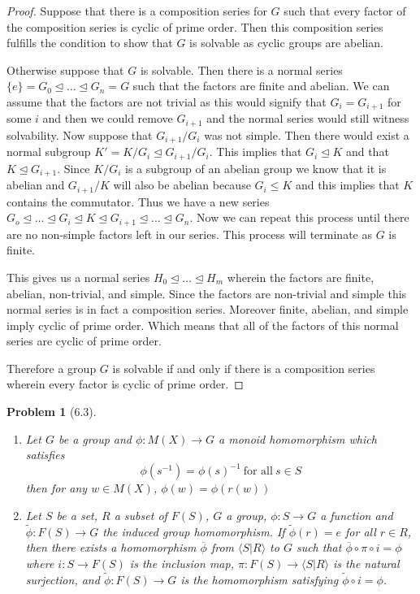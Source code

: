 \documentclass[10pt]{article}
\newcommand{\sk}{\vskip 10mm}
\theoremstyle{plain}
\newtheorem{problem}{Problem}
\theoremstyle{remark}
\begin{document}
\begin{proof}
  Suppose that there is a composition series for $G$ such that
  every factor of the composition series is cyclic of prime order. Then this
  composition series fulfills the condition to show that $G$ is solvable as
  cyclic groups are abelian.

  Otherwise suppose that $G$ is solvable. Then there is a normal series
  $\{e\}=G_0\trianglelefteq \ldots\trianglelefteq G_n=G$ such that the factors
  are finite and abelian. We can assume that the factors are not trivial as this
  would signify that $G_i=G_{i+1}$ for some $i$ and then we could remove $G_{i+1}$
  and the normal series would still witness solvability. Now suppose that
  $G_{i+1}/G_i$ was not simple. Then there would exist a normal subgroup
  $K'=K/G_i\trianglelefteq G_{i+1}/G_i$. This implies that $G_i\trianglelefteq K$
  and that $K\trianglelefteq G_{i+1}$. Since $K/G_i$ is a subgroup of an abelian
  group we know that it is abelian and $G_{i+1}/K$ will also be abelian because
  $G_i\leq K$ and this implies that $K$ contains the commutator. Thus we have a new
  series $G_o\trianglelefteq\ldots\trianglelefteq G_i\trianglelefteq K
  \trianglelefteq G_{i+1}\trianglelefteq\ldots\trianglelefteq G_n$. Now we can
  repeat this process until there are no non-simple factors left in our series.
  This process will terminate as $G$ is finite.

  This gives us a normal series $H_0\trianglelefteq\ldots\trianglelefteq H_m$
  wherein the factors are finite, abelian, non-trivial, and simple. Since
  the factors are non-trivial and simple this normal series is in fact
  a composition series. Moreover finite, abelian, and simple imply cyclic
  of prime order. Which means that all of the factors of this normal
  series are cyclic of prime order.

  Therefore a group $G$ is solvable if and only if there is a composition
  series wherein every factor is cyclic of prime order.
\end{proof}

\sk

\begin{problem}[6.3]
  \begin{enumerate}
  \item Let $G$ be a group and $\phi:M(X)\rightarrow G$ a monoid homomorphism which
    satisfies
    \[ \phi(s^{-1})=\phi(s)^{-1}\ \text{for all}\ s\in S \]
    then for any $w\in M(X)$, $\phi(w)=\phi(r(w))$
  \item Let $S$ be a set, $R$ a subset of $F(S)$, $G$ a group, $\phi:S\rightarrow G$
    a function and $\widetilde{\phi}:F(S)\rightarrow G$ the induced group homomorphism.
    If $\widetilde{\phi}(r)=e$ for all $r\in R$, then there exists a homomorphism
    $\overline{\phi}$ from $\langle S|R\rangle$ to $G$ such that $\overline{\phi}\circ\pi\circ i = \phi$ where
    $i:S\rightarrow F(S)$ is the inclusion map, $\pi:F(S)\rightarrow \langle S|R\rangle$ is the natural
    surjection, and $\widetilde{\phi}:F(S)\rightarrow G$ is the homomorphism
    satisfying $\widetilde{\phi}\circ i=\phi$.
  \end{enumerate}
\end{problem}
\end{document}
